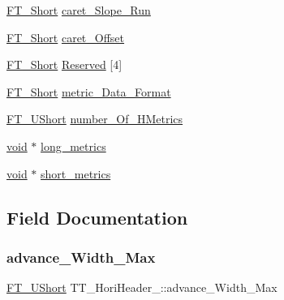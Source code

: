 \begin{DoxyCompactItemize}
\item 
\hyperlink{fttypes_8h_aa7279be89046a2563cd3d4d6651fbdcf}{F\+T\+\_\+\+Short} \hyperlink{struct_t_t___hori_header___acce162ae0554006c11a3383bd3454d69}{caret\+\_\+\+Slope\+\_\+\+Run}
\item 
\hyperlink{fttypes_8h_aa7279be89046a2563cd3d4d6651fbdcf}{F\+T\+\_\+\+Short} \hyperlink{struct_t_t___hori_header___a791ad767d54cc87e84d9b03d6739f0eb}{caret\+\_\+\+Offset}
\item 
\hyperlink{fttypes_8h_aa7279be89046a2563cd3d4d6651fbdcf}{F\+T\+\_\+\+Short} \hyperlink{struct_t_t___hori_header___af2a2b374d8f81771fb75d3bdc96bcbf7}{Reserved} \mbox{[}4\mbox{]}
\item 
\hyperlink{fttypes_8h_aa7279be89046a2563cd3d4d6651fbdcf}{F\+T\+\_\+\+Short} \hyperlink{struct_t_t___hori_header___a0ed857e9629d2dfb5350a6b5976bf933}{metric\+\_\+\+Data\+\_\+\+Format}
\item 
\hyperlink{fttypes_8h_a937f6c17cf5ffd09086d8610c37b9f58}{F\+T\+\_\+\+U\+Short} \hyperlink{struct_t_t___hori_header___aac3ecb9ba7c13436a663b91765e89647}{number\+\_\+\+Of\+\_\+\+H\+Metrics}
\item 
\hyperlink{png_8h_ac9c84fa68bbad002983e35ce3663c686}{void} $\ast$ \hyperlink{struct_t_t___hori_header___a3eeb5766b461e9563b659a30e775fcc2}{long\+\_\+metrics}
\item 
\hyperlink{png_8h_ac9c84fa68bbad002983e35ce3663c686}{void} $\ast$ \hyperlink{struct_t_t___hori_header___ae39107c4cfc3e7c1871dbb304bbe4a5a}{short\+\_\+metrics}
\end{DoxyCompactItemize}


\subsection{Field Documentation}
\mbox{\label{struct_t_t___hori_header___a1ddad7e4c5e6fed50c073745961814da}} 
\subsubsection{\texorpdfstring{advance\+\_\+\+Width\+\_\+\+Max}{advance\_Width\_Max}}
{\footnotesize\ttfamily \hyperlink{fttypes_8h_a937f6c17cf5ffd09086d8610c37b9f58}{F\+T\+\_\+\+U\+Short} T\+T\+\_\+\+Hori\+Header\+\_\+\+::advance\+\_\+\+Width\+\_\+\+Max}


